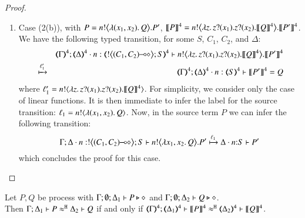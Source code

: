 \begin{proof}
\begin{enumerate}[1.]
\item Case (2(b)), with $P =  \bbout{n}{\abs{(x_1,x_2)} Q} P' $, 
$\map{P}^{4} = 
		\bbout{n}{\abs{z}\binp{z}{x_1}\binp{z}{x_2} \map{Q}^{4}} \map{P'}^{4}$.
		We have the following  typed transition, for some $S$, $C_1$, $C_2$, and $\Delta$:
\begin{eqnarray*}
& & \mapt{\Gamma}^{4}; 
\mapt{\Delta}^{4}\cat n:\tmap{\bbtout{\lhot{(C_1,  C_2)}} S}{4}
\proves 
\bbout{n}{\abs{z}\binp{z}{x_1}\binp{z}{x_2} \map{Q}^{4}} \map{P'}^{4} \\
& \hby{\ell'_1} & 
\mapt{\Gamma}^{4}; 
\mapt{\Delta}^{4}\cat n:\tmap{ S}{4} 
\proves 
\map{P'}^{4} = Q
\end{eqnarray*}
where
$\ell'_1 = \bactout{n}{\abs{z}\binp{z}{x_1} \binp{z}{x_2} \map{Q}^{4}}$.
For simplicity, we consider only the case of linear functions.
It is then immediate to infer the label for the source transition:
$\ell_1 = \bactout{n}{\abs{(x_1,  x_2)}{Q}} $. 
Now, in the source term $P$ we can infer the following transition:
$$
\stytra{\Gamma}{\ell_1}{\Delta\cat n:\bbtout{\lhot{(C_1,  C_2)}} S}{ \bbout{n}{\abs{x_1,x_2} Q} P'}{\Delta\cat n{:}S}{P'}
$$
which concludes the proof for this case.
\end{enumerate}
\end{proof}


\begin{proposition}\myrm
	\label{app:prop:fulla_pHOp_to_HOp}
	Let $P, Q$ be \HOpp process with $\Gamma; \es; \Delta_1 \proves P \hastype \Proc$ and 
	$\Gamma; \es; \Delta_2 \proves Q \hastype \Proc$. \\
	Then
	$\horel{\Gamma}{\Delta_1}{P}{\hwb}{\Delta_2}{Q}$ if and only if $\horel{\tmap{\Gamma}{4}}{\tmap{\Delta_1}{4}}{\pmap{P}{4}}{\hwb}{\tmap{\Delta_2}{4}}{\pmap{Q}{4}}$.
\end{proposition}

